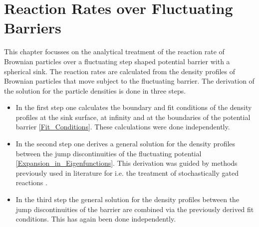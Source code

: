 \chapter{Reaction Rates over Fluctuating Barriers}
\label{Reaction_Rates_over_Fluctuating_Barriers}
This chapter focusses on the analytical treatment of the reaction rate of Brownian particles over a fluctuating step shaped potential barrier with a spherical sink. The reaction rates are calculated from the density profiles of Brownian particles that move subject to the fluctuating barrier. The derivation of the solution for the particle densities is done in three steps.
\begin{itemize}
    \item In the first step one calculates the boundary and fit conditions of the density profiles at the sink surface, at infinity and at the boundaries of the potential barrier \ref{Fit_Conditions}. These calculations were done independently. 
    \item In the second step one derives a general solution for the density profiles between the jump discontinuities of the fluctuating potential \ref{Expansion_in_Eigenfunctions}. This derivation was guided by methods previously used in literature for i.e. the treatment of stochastically gated reactions \cite{Szabo1982}. 
    \item In the third step the general solution for the density profiles between the jump discontinuities of the barrier are combined via the previously derived fit conditions. This has again been done independently.
\end{itemize}
